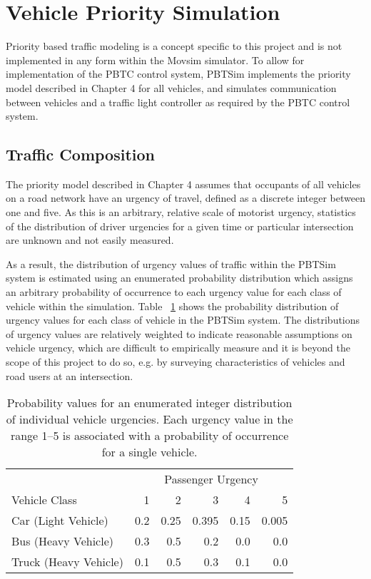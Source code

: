\section{Vehicle Priority Simulation}

Priority based traffic modeling is a concept specific to this project and is not implemented in any form within the Movsim simulator. To allow for implementation of the PBTC control system, PBTSim implements the priority model described in Chapter 4 for all vehicles, and simulates communication between vehicles and a traffic light controller as required by the PBTC control system.

\subsection{Traffic Composition}

The priority model described in Chapter 4 assumes that occupants of all vehicles on a road network have an urgency of travel, defined as a discrete integer between one and five. As this is an arbitrary, relative scale of motorist urgency, statistics of the distribution of driver urgencies for a given time or particular intersection are unknown and not easily measured.

As a result, the distribution of urgency values of traffic within the PBTSim system is estimated using an enumerated probability distribution which assigns an arbitrary probability of occurrence to each urgency value for each class of vehicle within the simulation. Table ~\ref{urgencydistribution} shows the probability distribution of urgency values for each class of vehicle in the PBTSim system. The distributions of urgency values are relatively weighted to indicate reasonable assumptions on vehicle urgency, which are difficult to empirically measure and it is beyond the scope of this project to do so, e.g. by surveying characteristics of vehicles and road users at an intersection. 

\begin{table}[]
\begin{center}
\begin{tabular}{lrrrrr}
\toprule
 & \multicolumn{5}{c}{Passenger Urgency} \\
 \cmidrule(lr){2-6}
Vehicle Class & 1 & 2 & 3 & 4 & 5 \\
\midrule
Car (Light Vehicle) & 0.2 & 0.25 & 0.395 & 0.15 & 0.005  \\
Bus (Heavy Vehicle) & 0.3 & 0.5 & 0.2 & 0.0 & 0.0 \\
Truck (Heavy Vehicle) & 0.1 & 0.5 & 0.3 & 0.1 & 0.0 \\
\bottomrule
\end{tabular}
\end{center}
\caption{Probability values for an enumerated integer distribution of individual vehicle urgencies. Each urgency value in the range 1--5 is associated with a probability of occurrence for a single vehicle. }
	\label{urgencydistribution}
\end{table}

